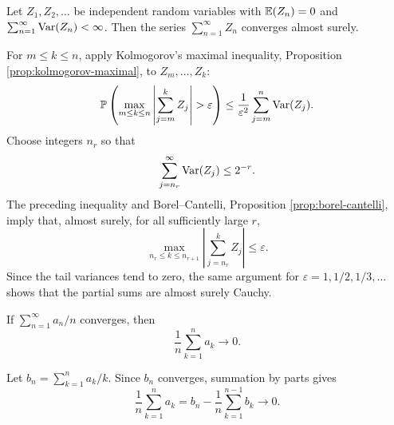 \begin{propositionbox}
    \label{prop:kolmogorov-convergence}
    Let $Z_1,Z_2,\ldots$ be independent random variables with
    $\mathbb{E}(Z_n)=0$ and $\sum_{n=1}^{\infty}\operatorname{\mathrm{Var}}(Z_n)<\infty$.
    Then the series $\sum_{n=1}^{\infty}Z_n$ converges almost surely.
\end{propositionbox}
\begin{proofbox}
    For $m\leq k\leq n$, apply Kolmogorov's maximal inequality,
    Proposition \ref{prop:kolmogorov-maximal}, to
    $Z_m,\ldots,Z_k$:
    $$\PP\left(\max_{m\leq k\leq n}
    \left|\sum_{j=m}^{k}Z_j\right|>\varepsilon\right)
    \leq \frac{1}{\varepsilon^2}\sum_{j=m}^{n}\Var(Z_j).$$
    Choose integers $n_r$ so that
    $$\sum_{j=n_r}^{\infty}\operatorname{\mathrm{Var}}(Z_j)\leq 2^{-r}.$$
    The preceding inequality and Borel--Cantelli, Proposition
    \ref{prop:borel-cantelli}, imply that, almost
    surely, for all sufficiently large $r$,
    $$\max_{n_r\leq k\leq n_{r+1}}
    \left|\sum_{j=n_r}^{k}Z_j\right|\leq\varepsilon.$$
    Since the tail variances tend to zero, the same argument for
    $\varepsilon=1,1/2,1/3,\ldots$ shows that the partial sums are
    almost surely Cauchy.
\end{proofbox}

\begin{lemmabox}\label{lem:kronecker}
    If $\sum_{n=1}^{\infty}a_n/n$ converges, then
    $$\frac{1}{n}\sum_{k=1}^{n}a_k\longrightarrow0.$$
\end{lemmabox}
\begin{proofbox}
    Let $b_n=\sum_{k=1}^{n}a_k/k$. Since $b_n$ converges,
    summation by parts gives
    $$\frac{1}{n}\sum_{k=1}^{n}a_k
    =b_n-\frac{1}{n}\sum_{k=1}^{n-1}b_k\longrightarrow0.$$
\end{proofbox}

